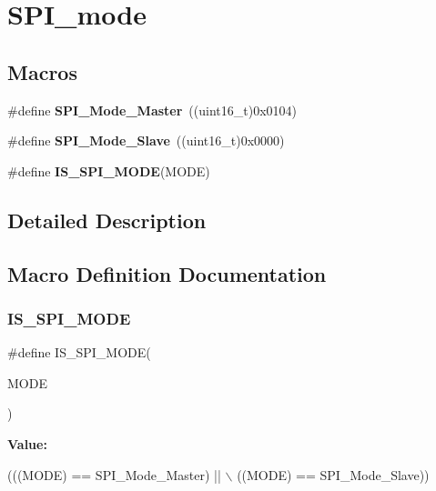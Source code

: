 \hypertarget{group___s_p_i__mode}{}\section{S\+P\+I\+\_\+mode}
\label{group___s_p_i__mode}
\subsection*{Macros}
\begin{DoxyCompactItemize}
\item 
\mbox{\label{group___s_p_i__mode_gaa9e47fb7c1d6c4655b72a00ed1f3b651}} 
\#define {\bfseries S\+P\+I\+\_\+\+Mode\+\_\+\+Master}~((uint16\+\_\+t)0x0104)
\item 
\mbox{\label{group___s_p_i__mode_ga84621141413ee07cb2d2dc82da2baa42}} 
\#define {\bfseries S\+P\+I\+\_\+\+Mode\+\_\+\+Slave}~((uint16\+\_\+t)0x0000)
\item 
\#define {\bfseries I\+S\+\_\+\+S\+P\+I\+\_\+\+M\+O\+DE}(M\+O\+DE)
\end{DoxyCompactItemize}


\subsection{Detailed Description}


\subsection{Macro Definition Documentation}
\mbox{\label{group___s_p_i__mode_gad5135300763c75dbb446861536359f12}} 
\subsubsection{\texorpdfstring{I\+S\+\_\+\+S\+P\+I\+\_\+\+M\+O\+DE}{IS\_SPI\_MODE}}
{\footnotesize\ttfamily \#define I\+S\+\_\+\+S\+P\+I\+\_\+\+M\+O\+DE(\begin{DoxyParamCaption}\item[{}]{M\+O\+DE }\end{DoxyParamCaption})}

{\bfseries Value\+:}
\begin{DoxyCode}
(((MODE) == SPI\_Mode\_Master) || \(\backslash\)
                           ((MODE) == SPI\_Mode\_Slave))
\end{DoxyCode}
